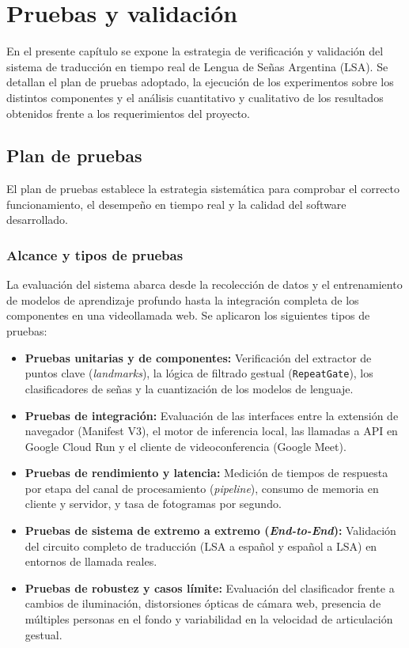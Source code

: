 \chapter{Pruebas y validación}
\label{cap:pruebas_validacion}

En el presente capítulo se expone la estrategia de verificación y validación del sistema de traducción en tiempo real de Lengua de Señas Argentina (LSA). Se detallan el plan de pruebas adoptado, la ejecución de los experimentos sobre los distintos componentes y el análisis cuantitativo y cualitativo de los resultados obtenidos frente a los requerimientos del proyecto.

\section{Plan de pruebas}
\label{sec:plan_pruebas}

El plan de pruebas establece la estrategia sistemática para comprobar el correcto funcionamiento, el desempeño en tiempo real y la calidad del software desarrollado.

\subsection{Alcance y tipos de pruebas}
La evaluación del sistema abarca desde la recolección de datos y el entrenamiento de modelos de aprendizaje profundo hasta la integración completa de los componentes en una videollamada web. Se aplicaron los siguientes tipos de pruebas:
\begin{itemize}
    \item \textbf{Pruebas unitarias y de componentes:} Verificación del extractor de puntos clave (\textit{landmarks}), la lógica de filtrado gestual (\texttt{RepeatGate}), los clasificadores de señas y la cuantización de los modelos de lenguaje.
    \item \textbf{Pruebas de integración:} Evaluación de las interfaces entre la extensión de navegador (Manifest V3), el motor de inferencia local, las llamadas a API en Google Cloud Run y el cliente de videoconferencia (Google Meet).
    \item \textbf{Pruebas de rendimiento y latencia:} Medición de tiempos de respuesta por etapa del canal de procesamiento (\textit{pipeline}), consumo de memoria en cliente y servidor, y tasa de fotogramas por segundo.
    \item \textbf{Pruebas de sistema de extremo a extremo (\textit{End-to-End}):} Validación del circuito completo de traducción (LSA a español y español a LSA) en entornos de llamada reales.
    \item \textbf{Pruebas de robustez y casos límite:} Evaluación del clasificador frente a cambios de iluminación, distorsiones ópticas de cámara web, presencia de múltiples personas en el fondo y variabilidad en la velocidad de articulación gestual.
\end{itemize}

